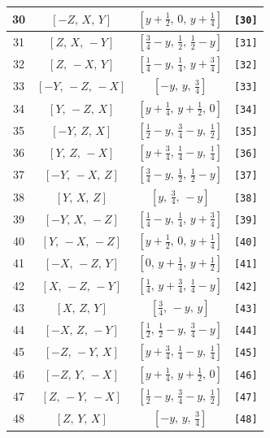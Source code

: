 \documentclass[fleqn,8pt]{jsarticle}
\begin{document}
\begin{longtable}{cccc}
30 & $\left[ - Z,\, X,\, Y \right]$ & $\left[ y + \frac{1}{2},\, 0,\, y + \frac{1}{4} \right]$ & {\tt [30]} \\ \hline
31 & $\left[ Z,\, X,\, - Y \right]$ & $\left[ \frac{3}{4} - y,\, \frac{1}{2},\, \frac{1}{2} - y \right]$ & {\tt [31]} \\ \hline
32 & $\left[ Z,\, - X,\, Y \right]$ & $\left[ \frac{1}{4} - y,\, \frac{1}{4},\, y + \frac{3}{4} \right]$ & {\tt [32]} \\ \hline
33 & $\left[ - Y,\, - Z,\, - X \right]$ & $\left[ - y,\, y,\, \frac{3}{4} \right]$ & {\tt [33]} \\ \hline
34 & $\left[ Y,\, - Z,\, X \right]$ & $\left[ y + \frac{1}{4},\, y + \frac{1}{2},\, 0 \right]$ & {\tt [34]} \\ \hline
35 & $\left[ - Y,\, Z,\, X \right]$ & $\left[ \frac{1}{2} - y,\, \frac{3}{4} - y,\, \frac{1}{2} \right]$ & {\tt [35]} \\ \hline
36 & $\left[ Y,\, Z,\, - X \right]$ & $\left[ y + \frac{3}{4},\, \frac{1}{4} - y,\, \frac{1}{4} \right]$ & {\tt [36]} \\ \hline
37 & $\left[ - Y,\, - X,\, Z \right]$ & $\left[ \frac{3}{4} - y,\, \frac{1}{2},\, \frac{1}{2} - y \right]$ & {\tt [37]} \\ \hline
38 & $\left[ Y,\, X,\, Z \right]$ & $\left[ y,\, \frac{3}{4},\, - y \right]$ & {\tt [38]} \\ \hline
39 & $\left[ - Y,\, X,\, - Z \right]$ & $\left[ \frac{1}{4} - y,\, \frac{1}{4},\, y + \frac{3}{4} \right]$ & {\tt [39]} \\ \hline
40 & $\left[ Y,\, - X,\, - Z \right]$ & $\left[ y + \frac{1}{2},\, 0,\, y + \frac{1}{4} \right]$ & {\tt [40]} \\ \hline
41 & $\left[ - X,\, - Z,\, Y \right]$ & $\left[ 0,\, y + \frac{1}{4},\, y + \frac{1}{2} \right]$ & {\tt [41]} \\ \hline
42 & $\left[ X,\, - Z,\, - Y \right]$ & $\left[ \frac{1}{4},\, y + \frac{3}{4},\, \frac{1}{4} - y \right]$ & {\tt [42]} \\ \hline
43 & $\left[ X,\, Z,\, Y \right]$ & $\left[ \frac{3}{4},\, - y,\, y \right]$ & {\tt [43]} \\ \hline
44 & $\left[ - X,\, Z,\, - Y \right]$ & $\left[ \frac{1}{2},\, \frac{1}{2} - y,\, \frac{3}{4} - y \right]$ & {\tt [44]} \\ \hline
45 & $\left[ - Z,\, - Y,\, X \right]$ & $\left[ y + \frac{3}{4},\, \frac{1}{4} - y,\, \frac{1}{4} \right]$ & {\tt [45]} \\ \hline
46 & $\left[ - Z,\, Y,\, - X \right]$ & $\left[ y + \frac{1}{4},\, y + \frac{1}{2},\, 0 \right]$ & {\tt [46]} \\ \hline
47 & $\left[ Z,\, - Y,\, - X \right]$ & $\left[ \frac{1}{2} - y,\, \frac{3}{4} - y,\, \frac{1}{2} \right]$ & {\tt [47]} \\ \hline
48 & $\left[ Z,\, Y,\, X \right]$ & $\left[ - y,\, y,\, \frac{3}{4} \right]$ & {\tt [48]} \\
\end{longtable}
\end{document}
